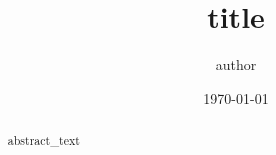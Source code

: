 \documentclass[11pt]{article}
\title{ {{ title }} }
\author{ {{ author }} }
\date{\today}
\begin{document}
\maketitle
\begin{abstract}
{{ abstract_text }}
\end{abstract}


\printbibliography
\end{document}
